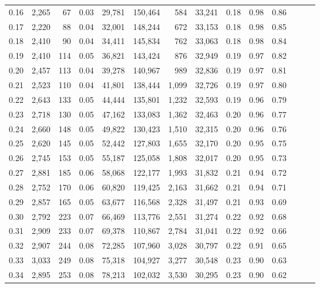 \begin{tabular}{rrrrrrrrrrrrrr}
0.16 &  2,265 &     67 &  0.03 &   29,781 &  150,464 &     584 &  33,241 &  0.18 &  0.98 &      0.86 \\
0.17 &  2,220 &     88 &  0.04 &   32,001 &  148,244 &     672 &  33,153 &  0.18 &  0.98 &      0.85 \\
0.18 &  2,410 &     90 &  0.04 &   34,411 &  145,834 &     762 &  33,063 &  0.18 &  0.98 &      0.84 \\
0.19 &  2,410 &    114 &  0.05 &   36,821 &  143,424 &     876 &  32,949 &  0.19 &  0.97 &      0.82 \\
0.20 &  2,457 &    113 &  0.04 &   39,278 &  140,967 &     989 &  32,836 &  0.19 &  0.97 &      0.81 \\
0.21 &  2,523 &    110 &  0.04 &   41,801 &  138,444 &   1,099 &  32,726 &  0.19 &  0.97 &      0.80 \\
0.22 &  2,643 &    133 &  0.05 &   44,444 &  135,801 &   1,232 &  32,593 &  0.19 &  0.96 &      0.79 \\
0.23 &  2,718 &    130 &  0.05 &   47,162 &  133,083 &   1,362 &  32,463 &  0.20 &  0.96 &      0.77 \\
0.24 &  2,660 &    148 &  0.05 &   49,822 &  130,423 &   1,510 &  32,315 &  0.20 &  0.96 &      0.76 \\
0.25 &  2,620 &    145 &  0.05 &   52,442 &  127,803 &   1,655 &  32,170 &  0.20 &  0.95 &      0.75 \\
0.26 &  2,745 &    153 &  0.05 &   55,187 &  125,058 &   1,808 &  32,017 &  0.20 &  0.95 &      0.73 \\
0.27 &  2,881 &    185 &  0.06 &   58,068 &  122,177 &   1,993 &  31,832 &  0.21 &  0.94 &      0.72 \\
0.28 &  2,752 &    170 &  0.06 &   60,820 &  119,425 &   2,163 &  31,662 &  0.21 &  0.94 &      0.71 \\
0.29 &  2,857 &    165 &  0.05 &   63,677 &  116,568 &   2,328 &  31,497 &  0.21 &  0.93 &      0.69 \\
0.30 &  2,792 &    223 &  0.07 &   66,469 &  113,776 &   2,551 &  31,274 &  0.22 &  0.92 &      0.68 \\
0.31 &  2,909 &    233 &  0.07 &   69,378 &  110,867 &   2,784 &  31,041 &  0.22 &  0.92 &      0.66 \\
0.32 &  2,907 &    244 &  0.08 &   72,285 &  107,960 &   3,028 &  30,797 &  0.22 &  0.91 &      0.65 \\
0.33 &  3,033 &    249 &  0.08 &   75,318 &  104,927 &   3,277 &  30,548 &  0.23 &  0.90 &      0.63 \\
0.34 &  2,895 &    253 &  0.08 &   78,213 &  102,032 &   3,530 &  30,295 &  0.23 &  0.90 &      0.62 \\

\end{tabular}
